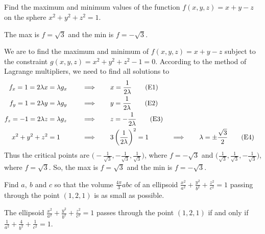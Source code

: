 \subsection*{\Procedural}


\begin{question}
Find the maximum and minimum values of the function  
$f(x,y,z)=x+y-z$ on the sphere $x^2+y^2+z^2=1$.
\end{question}

%

\begin{answer}
The max is $f=\sqrt{3}$ and the min is $f=-\sqrt{3}$.
\end{answer}

\begin{solution}
We are to find the maximum and minimum of $f(x,y,z)=x+y-z$
subject to the constraint $g(x,y,z) = x^2+y^2+z^2 -1=0$.
According to the method of Lagrange multipliers, we need to find 
all solutions to
\begin{alignat*}{7}
f_x = 1 = 2\lambda x  &= \lambda g_x 
      \quad&&\implies\quad && x=\frac{1}{2\lambda} \tag{E1} \\ 
f_y = 1 = 2\lambda y &= \lambda g_y 
      \quad&&\implies\quad && y=\frac{1}{2\lambda}\tag{E2} \\ 
f_z = -1 = 2\lambda z &= \lambda g_z 
       \quad&&\implies\quad && z=-\frac{1}{2\lambda} \tag{E3} \\ 
x^2+y^2+z^2&=1 
       \quad&&\implies\quad &&3\left(\frac{1}{2\lambda}\right)^2=1
\quad&&\implies\quad & \lambda&=\pm\frac{\sqrt{3}}{2}\tag{E4}
\end{alignat*}
Thus the critical points are 
$\big(-\frac{1}{\sqrt{3}},-\frac{1}{\sqrt{3}},\frac{1}{\sqrt{3}}\big)$,
where $f=-\sqrt{3}$
and 
$\big(\frac{1}{\sqrt{3}},\frac{1}{\sqrt{3}},-\frac{1}{\sqrt{3}}\big)$,
where $f=\sqrt{3}$. So, the max is $f=\sqrt{3}$ and the min is 
$f=-\sqrt{3}$.
\end{solution}

\begin{question}
Find $a,\ b$ and $c$ so that the volume $\frac{4\pi}{3} abc$ of an ellipsoid
$\frac{x^2}{a^2}+\frac{y^2}{b^2}+\frac{z^2}{c^2}=1$ passing through
the point $(1,2,1)$ is as small as possible.
\end{question}

\begin{hint}
The ellipsoid $\frac{x^2}{a^2}+\frac{y^2}{b^2}+\frac{z^2}{c^2}=1$ passes 
through the point $(1,2,1)$ if and only if 
$\frac{1}{a^2}+\frac{4}{b^2}+\frac{1}{c^2}=1$.
\end{hint}

